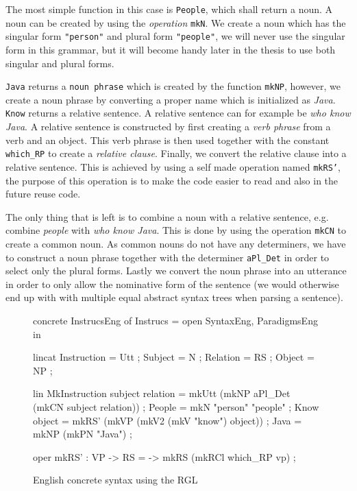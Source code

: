The most simple function in this case is \texttt{People}, which shall return a noun. A noun can be created by using the \emph{operation} \texttt{mkN}. We create a noun which has the singular form \texttt{"person"} and plural form \texttt{"people"}, we will never use the singular form in this grammar, but it will become handy later in the thesis to use both singular and plural forms.

\texttt{Java} returns a \texttt{noun phrase} which is created by the function \texttt{mkNP}, however, we create a noun phrase by converting a proper name which is initialized as \emph{Java}. \texttt{Know} returns a relative sentence. A relative sentence can for example be \emph{who know Java}. A relative sentence is constructed by first creating a \emph{verb phrase} from a verb and an object. This verb phrase is then used together with the constant \texttt{which\_RP} to create a \emph{relative clause}. Finally, we convert the relative clause into a relative sentence. This is achieved by using a self made operation named \texttt{mkRS'}, the purpose of this operation is to make the code easier to read and also in the future reuse code. 

The only thing that is left is to combine a noun with a relative sentence, e.g. combine \emph{people} with \emph{who know Java}. This is done by using the operation \texttt{mkCN} to create a common noun. As common nouns do not have any determiners, we have to construct a noun phrase together with the determiner \texttt{aPl\_Det} in order to select only the plural forms. Lastly we convert the noun phrase into an utterance in order to only allow the nominative form of the sentence (we would otherwise end up with with multiple equal abstract syntax trees when parsing a sentence).

\begin{figure}[h]
\begin{code}
concrete InstrucsEng of Instrucs = open SyntaxEng, ParadigmsEng in {
  lincat
    Instruction = Utt ;
    Subject = N ;
    Relation = RS ;
    Object = NP ;

  lin
    MkInstruction subject relation = mkUtt 
                                      (mkNP aPl_Det (mkCN subject relation)) ;
    People = mkN "person" "people" ;
    Know object = mkRS' (mkVP (mkV2 (mkV "know") object)) ;
    Java = mkNP (mkPN "Java") ;
    
   oper
      mkRS' : VP -> RS = \vp -> mkRS (mkRCl which_RP vp) ;
}
\end{code}
\caption{English concrete syntax using the RGL\label{fig:english-RGL}}
\end{figure}

